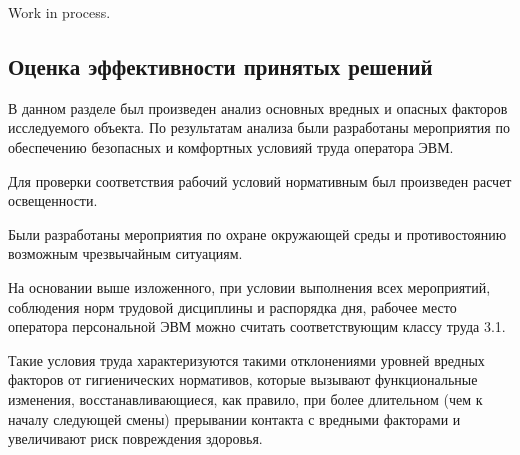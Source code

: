 Work in process.

\subsection{Оценка эффективности принятых решений}

В данном разделе был произведен анализ основных вредных и опасных факторов исследуемого объекта.
По результатам анализа были разработаны мероприятия по обеспечению безопасных и комфортных условияй труда оператора ЭВМ.

Для проверки соответствия рабочий условий нормативным был произведен расчет освещенности.

Были разработаны мероприятия по охране окружающей среды и противостоянию возможным чрезвычайным ситуациям.

На основании выше изложенного, при условии выполнения всех мероприятий, соблюдения норм трудовой дисциплины и распорядка дня, рабочее место оператора персональной ЭВМ можно считать соответствующим классу труда 3.1.

Такие условия труда характеризуются такими отклонениями уровней вредных факторов от гигиенических нормативов, которые вызывают функциональные изменения, восстанавливающиеся, как правило, при более длительном (чем к началу следующей смены) прерывании контакта с вредными факторами и увеличивают риск повреждения здоровья.

\clearpage
\newpage